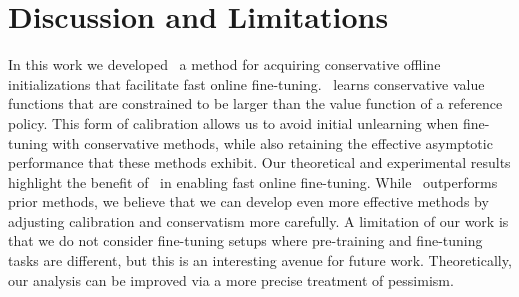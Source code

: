 \section{Discussion and  Limitations}

In this work we developed \methodname\, a method for acquiring conservative offline initializations that facilitate fast online fine-tuning. \methodname\ learns conservative value functions that are constrained to be larger than the value function of a reference policy. This form of calibration allows us to avoid initial unlearning when fine-tuning with conservative methods, while also retaining the effective asymptotic performance that these methods exhibit. Our theoretical and experimental results highlight the benefit of \methodname\ in enabling fast online fine-tuning. 
While \methodname\ outperforms prior methods, we believe that we can develop even more effective methods by adjusting calibration and conservatism more carefully. A limitation of our work is that we do not consider fine-tuning setups where pre-training and fine-tuning tasks are different, but this is an interesting avenue for future work. Theoretically, our analysis can be improved via a more precise treatment of pessimism.